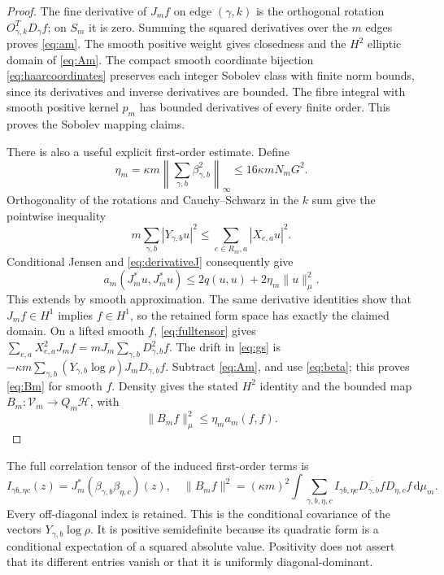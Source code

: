 \documentclass[11pt]{article}
\newcommand{\dd}{\,\mathrm d}
\newcommand{\HH}{\mathscr H}
\newcommand{\VV}{\mathscr V}
\begin{document}
\begin{proof}
The fine derivative of $J_mf$ on edge $(\gamma,k)$ is the orthogonal
rotation $O_{\gamma,k}^TD_\gamma f$; on $S_m$ it is zero.
Summing the squared derivatives over the $m$ edges proves \eqref{eq:am}.
The smooth positive weight gives closedness and the $H^2$ elliptic domain
of \eqref{eq:Am}. The compact smooth coordinate bijection
\eqref{eq:haarcoordinates} preserves each integer Sobolev class with
finite norm bounds, since its derivatives and inverse derivatives are
bounded. The fibre integral with smooth positive kernel $p_m$ has bounded
derivatives of every finite order. This proves the Sobolev mapping claims.

There is also a useful explicit first-order estimate. Define
\[
 \eta_m=\kappa m\left\|\sum_{\gamma,b}\beta_{\gamma,b}^2\right\|_\infty
             \leq16\kappa mN_mG^2.
\]
Orthogonality of the rotations and Cauchy--Schwarz in the $k$ sum give
the pointwise inequality
\[
 m\sum_{\gamma,b}|Y_{\gamma,b}u|^2
 \leq\sum_{e\in R_m,a}|X_{e,a}u|^2.
\]
Conditional Jensen and \eqref{eq:derivativeJ} consequently give
\begin{equation}\label{eq:projectionbound}
 a_m(J_m^*u,J_m^*u)\leq2q(u,u)+2\eta_m\|u\|_\mu^2.
\end{equation}
This extends by smooth approximation. The same derivative identities
show that $J_mf\in H^1$ implies $f\in H^1$, so the retained form space
has exactly the claimed domain.
On a lifted smooth $f$, \eqref{eq:fulltensor} gives
$\sum_{e,a}X_{e,a}^2J_mf=mJ_m\sum_{\gamma,b}D_{\gamma,b}^2f$.
The drift in \eqref{eq:gs} is
$-\kappa m\sum_{\gamma,b}(Y_{\gamma,b}\log\rho)J_mD_{\gamma,b}f$.
Subtract \eqref{eq:Am}, and use \eqref{eq:beta}; this proves
\eqref{eq:Bm} for smooth $f$. Density gives the stated $H^2$ identity
and the bounded map $B_m:\VV_m\to Q_m\HH$, with
\begin{equation}\label{eq:Bbound}
 \|B_mf\|_\mu^2\leq\eta_m a_m(f,f).
\end{equation}
\end{proof}

The full correlation tensor of the induced first-order terms is
\begin{equation}\label{eq:Fisher}
 I_{\gamma b,\eta c}(z)=J_m^*(\beta_{\gamma,b}\beta_{\eta,c})(z),\quad
 \|B_mf\|^2=(\kappa m)^2\int
 \sum_{\gamma,b,\eta,c}I_{\gamma b,\eta c}
              \overline{D_{\gamma,b}f}D_{\eta,c}f\dd\mu_m.
\end{equation}
Every off-diagonal index is retained. This is the conditional covariance
of the vectors $Y_{\gamma,b}\log\rho$. It is positive semidefinite
because its quadratic form is a conditional expectation of a squared
absolute value. Positivity does not assert that its different entries
vanish or that it is uniformly diagonal-dominant.
\end{document}
